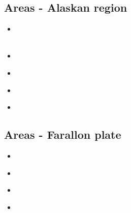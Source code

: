 \subsection{Areas - Alaskan region} 

\begin{scriptsize}
\begin{itemize}
\item[\twothousandten] 
\textcite{kohp10} \\
\textcite{jabi10} \\
\item[\twothousandtwelve] 
\textcite{jabi12} \\
\item[\twothousandthirteen] 
\textcite{jabr13} \\
\item[\twothousandseventeen] 
\textcite{haja17} \\
\item[\twothousandeighteen] 
\textcite{mimo18} \\
\end{itemize}
\end{scriptsize}

\subsection{Areas - Farallon plate} 

\begin{scriptsize}
\begin{itemize}
\item[\twothousandeight]
\textcite{lisg08} \\
\item[\twothousandeleven]
\textcite{list11} \\
\item[\twothousandtwelve]
\textcite{list12} \\
\item[\twothousandsixteen]
\textcite{licu16} \\
\end{itemize}
\end{scriptsize}

